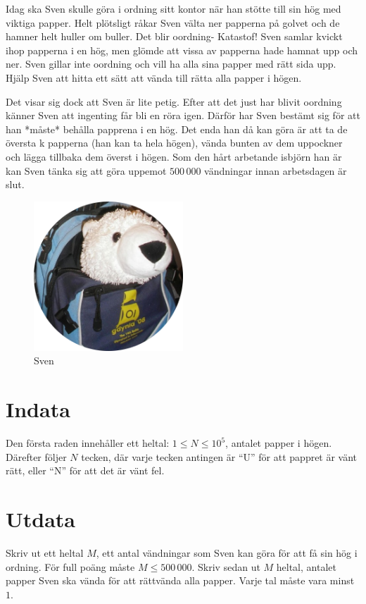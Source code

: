 Idag ska Sven skulle göra i ordning sitt kontor när han stötte till sin hög med viktiga papper.
Helt plötsligt råkar Sven välta ner papperna på golvet och de hamner helt huller om buller. Det blir oordning- Katastof!
Sven samlar kvickt ihop papperna i en hög, men glömde att vissa av papperna hade hamnat upp och ner.
Sven gillar inte oordning och vill ha alla sina papper med rätt sida upp.
Hjälp Sven att hitta ett sätt att vända till rätta alla papper i högen.

Det visar sig dock att Sven är lite petig.
Efter att det just har blivit oordning känner Sven att ingenting får bli en röra igen.
Därför har Sven bestämt sig för att han *måste* behålla papprena i en hög.
Det enda han då kan göra är att ta de översta k papperna (han kan ta hela högen), vända bunten av dem uppockner och lägga tillbaka dem överst i högen.
Som den hårt arbetande isbjörn han är kan Sven tänka sig att göra uppemot $500\,000$ vändningar innan arbetsdagen är slut.

\begin{figure}[h]
	\centering
\includegraphics[width=0.5\textwidth]{sven-circular.png}
\caption{Sven}
\end{figure}

\section*{Indata}
Den första raden innehåller ett heltal: $1\leq N \leq 10^5$, antalet papper i högen.
Därefter följer $N$ tecken, där varje tecken antingen är ``U'' för att pappret är vänt rätt, eller ``N'' för att det är vänt fel. 

\section*{Utdata}
Skriv ut ett heltal $M$, ett antal vändningar som Sven kan göra för att få sin hög i ordning. För full poäng måste  $M \leq 500\,000$.
Skriv sedan ut $M$ heltal, antalet papper Sven ska vända för att rättvända alla papper. Varje tal måste vara minst $1$.

